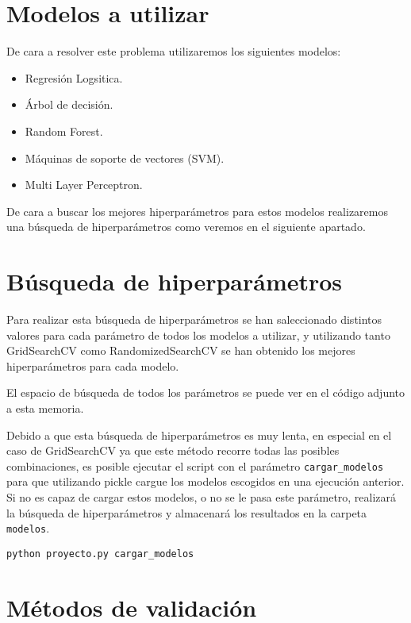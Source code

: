 \section{Modelos a utilizar}

De cara a resolver este problema utilizaremos los siguientes modelos:

\begin{itemize}
	\item Regresión Logsitica.
	\item Árbol de decisión.
	\item Random Forest.
	\item Máquinas de soporte de vectores (SVM).
	\item Multi Layer Perceptron.
\end{itemize}


De cara a buscar los mejores hiperparámetros para estos modelos realizaremos una búsqueda de hiperparámetros como veremos en el siguiente apartado.

\section{Búsqueda de hiperparámetros}

Para realizar esta búsqueda de hiperparámetros se han saleccionado distintos valores para cada parámetro de todos los modelos a utilizar, y utilizando tanto GridSearchCV como RandomizedSearchCV se han obtenido los mejores hiperparámetros para cada modelo.

El espacio de búsqueda de todos los parámetros se puede ver en el código adjunto a esta memoria.

Debido a que esta búsqueda de hiperparámetros es muy lenta, en especial en el caso de GridSearchCV ya que este método recorre todas las posibles combinaciones, es posible ejecutar el script con el parámetro \texttt{cargar\_modelos} para que utilizando pickle cargue los modelos escogidos en una ejecución anterior. Si no es capaz de cargar estos modelos, o no se le pasa este parámetro, realizará la búsqueda de hiperparámetros y almacenará los resultados en la carpeta \texttt{modelos}.

\begin{lstlisting}
python proyecto.py cargar_modelos
\end{lstlisting}

\section{Métodos de validación}
